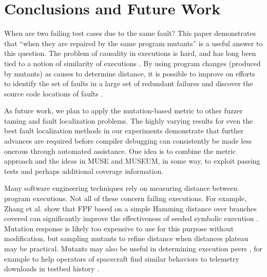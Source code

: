 \section{Conclusions and Future Work}
\label{conc}

When are two failing test cases due to the same fault?  This paper
demonstrates that
``when they are repaired by the same program mutants'' is a useful answer to
this question.  The problem of causality in executions is hard, and
has long been tied to a notion of similarity of
executions \cite{NearNeighbor,GroceError}.  By using program changes
(produced by mutants) as
causes to determine distance, it is possible to improve on efforts
to identify the set of faults in a large set of redundant failures
\cite{PLDI13} and discover the source code locations of faults
\cite{MUSE,multilingual}.

As future work, we plan to apply the mutation-based metric to other
fuzzer taming and fault localization problems.  The highly varying
results for even the best fault localization methods in our
experiments demonstrate that further advances are required before
compiler debugging can consistently be made less onerous through automated
assistance.  One idea is to combine the metric approach and the ideas
in MUSE and MUSEUM, in some way, to exploit passing tests and perhaps
additional coverage information.

Many software engineering techniques rely on measuring distance
between program executions.  Not all of these concern failing
executions.  For example, Zhang et al. \cite{issta14} show that FPF based on a simple
Hamming distance over branches covered can significantly improve the
effectiveness of seeded symbolic execution
\cite{Zesti,PersonSeed,BugRedux}.  Mutation response is likely too
expensive to use for this purpose without modification, but sampling
mutants to refine distance when distances plateau
may be practical.  Mutants may also be useful in determining
execution peers \cite{Sumner2011}, for example to help operators of
spacecraft find similar behaviors to telemetry downloads in testbed
history \cite{KlausRajeev,scriptstospecs}.